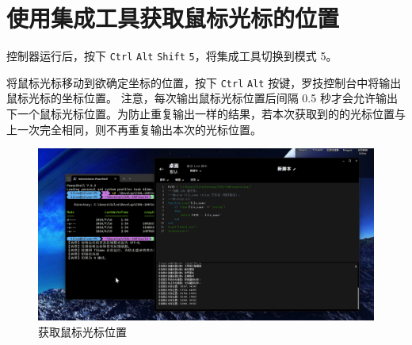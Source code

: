 \section{使用集成工具获取鼠标光标的位置}

控制器运行后，按下 \lstinline{Ctrl} \lstinline{Alt} \lstinline{Shift} \lstinline{5}，将集成工具切换到模式 5。

将鼠标光标移动到欲确定坐标的位置，按下 \lstinline{Ctrl} \lstinline{Alt} 按键，罗技控制台中将输出鼠标光标的坐标位置。
注意，每次输出鼠标光标位置后间隔 0.5 秒才会允许输出下一个鼠标光标位置。为防止重复输出一样的结果，若本次获取到的的光标位置与上一次完全相同，则不再重复输出本次的光标位置。

\begin{figure}[H]
    \Centering
    \includegraphics[width=\textwidth]{docs/assets/position.png}
    \caption{获取鼠标光标位置}
\end{figure}